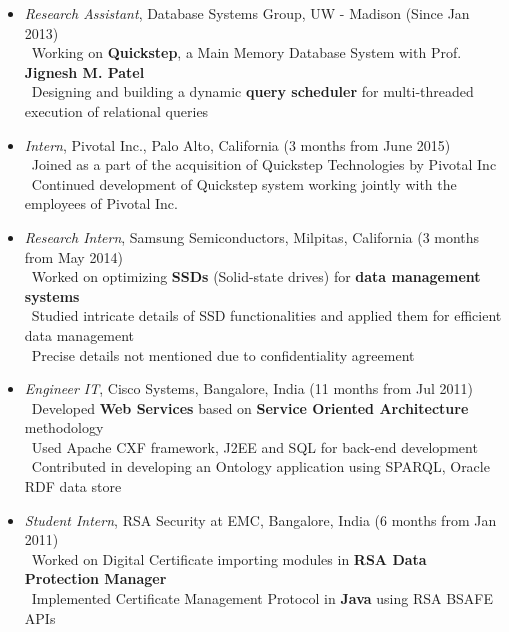 \documentclass[11pt]{article}
\begin{document}
\begin{itemize}\addtolength{\itemsep}{-0.5\baselineskip}
	\item{\textit{Research Assistant}, Database Systems Group, UW - Madison \hfill (Since Jan 2013)}\\
		\textendash\ Working on \textbf{Quickstep}, a Main Memory Database System with Prof. \textbf{Jignesh M. Patel} \\
		\textendash\ Designing and building a dynamic \textbf{query scheduler} for multi-threaded execution of relational queries \\
	\item{\textit{Intern}, Pivotal Inc., Palo Alto, California \hfill (3 months from June 2015)}\\
	\textendash\ Joined as a part of the acquisition of Quickstep Technologies by Pivotal Inc\\
	\textendash\ Continued development of Quickstep system working jointly with the employees of Pivotal Inc.\\
	\item{\textit{Research Intern}, Samsung Semiconductors, Milpitas, California \hfill (3 months from May 2014)}\\
		\textendash\ Worked on optimizing \textbf{SSDs} (Solid-state drives) for \textbf{data management systems} \\
		\textendash\ Studied intricate details of SSD functionalities and applied them for efficient data management \\
		\textendash\ Precise details not mentioned due to confidentiality agreement\\
	\item{\textit{Engineer IT}, Cisco Systems, Bangalore, India \hfill (11 months from Jul 2011)}\\
		\textendash\ Developed \textbf{Web Services} based on \textbf{Service Oriented Architecture} methodology\\
		\textendash\ Used Apache CXF framework, J2EE and SQL for back-end development\\
		\textendash\ Contributed in developing an Ontology application using SPARQL, Oracle RDF data store\\
	\item{\textit{Student Intern}, RSA Security at EMC, Bangalore, India \hfill (6 months from Jan 2011)}\\
		\textendash\ Worked on Digital Certificate importing modules in \textbf{RSA Data Protection Manager}\\
		\textendash\ Implemented Certificate Management Protocol in \textbf{Java} using RSA BSAFE APIs\\
\end{itemize}
\end{document}
